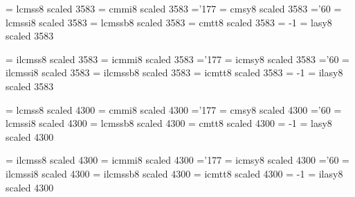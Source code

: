 \font\twentyninerm   = lcmss8  scaled 3583 %
\font\twentyninei    = cmmi8   scaled 3583 %
    \skewchar\twentyninei ='177                  %
\font\twentyninesy   = cmsy8   scaled 3583 %
    \skewchar\twentyninesy ='60           %
\font\twentynineit   = lcmssi8 scaled 3583 %
\font\twentyninebf   = lcmssb8 scaled 3583 %
\font\twentyninett   = cmtt8   scaled 3583 %
    \hyphenchar\twentyninett = -1         %
\font\twentyninelasy = lasy8  scaled 3583 %

\font\itwentyninerm   = ilcmss8  scaled 3583 %
\font\itwentyninei    = icmmi8   scaled 3583 %
    \skewchar\itwentyninei ='177                  %
\font\itwentyninesy   = icmsy8   scaled 3583 %
    \skewchar\itwentyninesy ='60           %
\font\itwentynineit   = ilcmssi8 scaled 3583 %
\font\itwentyninebf   = ilcmssb8 scaled 3583 %
\font\itwentyninett   = icmtt8   scaled 3583 %
    \hyphenchar\itwentyninett = -1         %
\font\itwentyninelasy = ilasy8  scaled 3583 %

\font\thirtyfourrm   = lcmss8  scaled 4300 %
\font\thirtyfouri    = cmmi8   scaled 4300 %
    \skewchar\thirtyfouri ='177                  %
\font\thirtyfoursy   = cmsy8   scaled 4300 %
    \skewchar\thirtyfoursy ='60           %
\font\thirtyfourit   = lcmssi8 scaled 4300 %
\font\thirtyfourbf   = lcmssb8 scaled 4300 %
\font\thirtyfourtt   = cmtt8   scaled 4300 %
    \hyphenchar\thirtyfourtt = -1         %
\font\thirtyfourlasy = lasy8  scaled 4300 %

\font\ithirtyfourrm   = ilcmss8  scaled 4300 %
\font\ithirtyfouri    = icmmi8   scaled 4300 %
    \skewchar\ithirtyfouri ='177                  %
\font\ithirtyfoursy   = icmsy8   scaled 4300 %
    \skewchar\ithirtyfoursy ='60           %
\font\ithirtyfourit   = ilcmssi8 scaled 4300 %
\font\ithirtyfourbf   = ilcmssb8 scaled 4300 %
\font\ithirtyfourtt   = icmtt8   scaled 4300 %
    \hyphenchar\ithirtyfourtt = -1         %
\font\ithirtyfourlasy = ilasy8  scaled 4300 %

